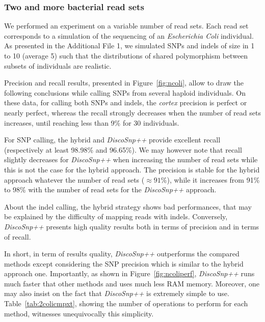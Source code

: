 \documentclass{bmcart}
\newcommand{\discopp}{{\it DiscoSnp++}\xspace}
\newcommand{\co}{{\it cortex}\xspace}
\begin{document}
\subsubsection*{Two and more bacterial read sets}
We performed an experiment on a variable number of read sets. Each read set corresponds to a simulation of the sequencing of an \emph{Escherichia Coli} individual. As presented in the Additional File 1, we simulated SNPs and indels of size in 1 to 10 (average 5) such that the distributions of shared polymorphism between subsets of individuals are realistic. 

Precision and recall results, presented in Figure~\ref{fig:ncoli}, allow to draw the following conclusions while calling SNPs from several haploid individuals. 
On these data, for calling both SNPs and indels, the \co precision is perfect or nearly perfect, whereas the recall strongly decreases when the number of read sets increases, until reaching less than 9\% for 30 individuals. 

For SNP calling, the hybrid and \discopp provide excellent recall (respectively at least 98.98\% and 96.65\%). We may however note that recall slightly decreases for \discopp when increasing the number of read sets while this is not the case for the hybrid approach. The precision is stable for the hybrid approach whatever the number of read sets ($\approx 91\%$), while it increases from 91\% to 98\% with the number of read sets for the \discopp approach. 


About the indel calling, the hybrid strategy shows bad performances, that may be explained by the difficulty of mapping reads with indels. Conversely, \discopp presents high quality results both in terms of precision and in terms of recall. 

In short, in term of results quality,  \discopp outperforms the compared methods except considering the SNP precision which is similar to the hybrid approach one. 
Importantly, as shown in Figure~\ref{fig:ncoliperf}, \discopp runs much faster that other methods and uses much less RAM memory. Moreover, one may also insist on the fact that \discopp is extremely simple to use. Table~\ref{tab:2colicmpxt}, showing the number of operations to perform for each method, witnesses unequivocally
this simplicity.
\end{document}
